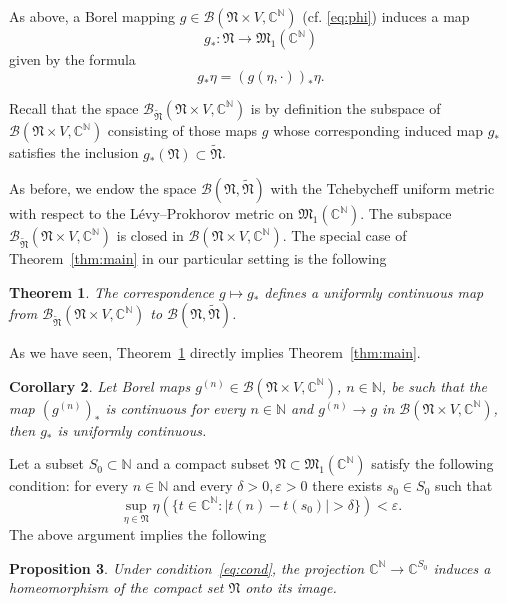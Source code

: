 \documentclass[12pt,a4paper]{article}
\newtheorem{theorem}{Theorem}[section]
\newtheorem{proposition}[theorem]{Proposition}
\newtheorem{corollary}[theorem]{Corollary}
\theoremstyle{definition}
\theoremstyle{remark}
\newcommand{\BB}{\mathscr{B}}
\newcommand{\MM}{{\mathfrak{M}}}
\newcommand{\NN}{{\mathfrak{N}}}
\begin{document}
	As above, a Borel mapping $g \in \BB(\NN \times V, \mathbb{C}^{\mathbb{N}})$ (cf. \eqref{eq:phi}) induces a map 
	$$g_* \colon \NN \to \MM_1(\mathbb{C}^{\mathbb{N}})$$
	given by the formula
	\[
	g_* \eta = (g(\eta, \cdot))_* \eta.
	\]
	
	Recall that the space $\BB_{\widetilde{\NN}}(\NN \times V, \mathbb{C}^{\mathbb{N}})$ is by definition the subspace of
	$\BB(\NN \times V, \mathbb{C}^{\mathbb{N}})$ consisting of those  maps $g$ whose corresponding induced map $g_*$  satisfies the inclusion $g_*(\NN) \subset \widetilde{\NN}$.
	
	As before, we endow the space $\BB(\NN, \widetilde{\NN})$ with the Tchebycheff uniform metric with respect to the
	L\'evy--Prokhorov metric on $\MM_1(\mathbb{C}^{\mathbb{N}})$. The subspace $\BB_{\widetilde{\NN}}(\NN \times V, \mathbb{C}^{\mathbb{N}})$
	is closed in $\BB(\NN \times V, \mathbb{C}^{\mathbb{N}})$. The special case of Theorem~\ref{thm:main} in our particular setting is the following
	
	\begin{theorem}
		\label{thm:2.3}
		The correspondence $g \mapsto g_*$ defines a uniformly continuous map from $\BB_{\widetilde{\NN}}(\NN \times V, \mathbb{C}^{\mathbb{N}})$ to $\BB(\NN, \widetilde{\NN})$.
	\end{theorem}
	
	As we have seen, Theorem~\ref{thm:2.3} directly implies Theorem~\ref{thm:main}.
	
	\begin{corollary}
		\label{cor:2.4}
		Let Borel maps $g^{(n)} \in \BB(\NN \times V, \mathbb{C}^{\mathbb{N}})$, $n \in \mathbb{N}$, be such that the map $(g^{(n)})_*$ is
		continuous for every $n \in \mathbb{N}$ and $g^{(n)} \to g$ in $\BB(\NN \times V, \mathbb{C}^{\mathbb{N}})$,
		then $g_*$ is uniformly continuous.
	\end{corollary}
	
	Let a subset $S_0 \subset \mathbb{N}$ and a compact subset $\NN \subset \MM_1(\mathbb{C}^{\mathbb{N}})$ satisfy
	the following condition: for every $n \in \mathbb{N}$ and every $\delta > 0, \varepsilon > 0$ there exists
	$s_0 \in S_0$ such that
	\begin{equation}
		\label{eq:cond}
		\sup_{\eta \in \NN}
		\eta(\{ t \in \mathbb{C}^{\mathbb{N}} : |t(n) - t(s_0)| > \delta \})
		< \varepsilon.
	\end{equation}
	The above argument implies the following
	\begin{proposition}
		\label{prop:2.5}
		Under condition~\eqref{eq:cond}, the projection $\mathbb{C}^{\mathbb{N}} \to \mathbb{C}^{S_0}$ induces
		a homeomorphism of the compact set $\NN$ onto its image.
	\end{proposition}
	
\end{document}
